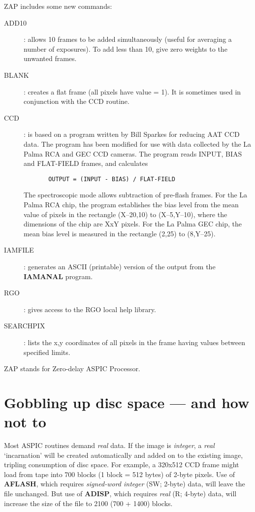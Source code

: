 ZAP includes some new commands:
\begin{description}
\item [ADD10] :
allows 10 frames to be added simultaneously (useful for averaging a number of
exposures).
To add less than 10, give zero weights to the unwanted frames.
\item [BLANK] :
creates a flat frame (all pixels have value = 1).
It is sometimes used in conjunction with the CCD routine.
\item [CCD] :
is based on a program written by Bill Sparkes for reducing AAT CCD data.
The program has been modified for use with data collected by the La Palma RCA
and GEC CCD cameras.
The program reads INPUT, BIAS and FLAT-FIELD frames, and calculates
\begin{verbatim}
       OUTPUT = (INPUT - BIAS) / FLAT-FIELD
\end{verbatim}
The spectroscopic mode allows subtraction of pre-flash frames.
For the La Palma RCA chip, the program establishes the bias level from the
mean value of pixels in the rectangle (X--20,10) to (X--5,Y--10), where the
dimensions of the chip are XxY pixels.
For the La Palma GEC chip, the mean bias level is measured in the rectangle
(2,25) to (8,Y--25).
\item [IAMFILE] :
generates an ASCII (printable) version of the output from the {\bf IAMANAL}
program.
\item [RGO] :
gives access to the RGO local help library.
\item [SEARCHPIX] :
lists the x,y coordinates of all pixels in the frame having values between
specified limits.
\end{description}

ZAP stands for Zero-delay ASPIC Processor.

\section {Gobbling up disc space --- and how not to}

Most ASPIC routines demand {\em real} data.
If the image is {\em integer}, a {\em real} `incarnation' will be created
automatically and added on to the existing image, tripling consumption of
disc space.
For example, a 320x512 CCD frame might load from tape into 700 blocks
(1 block = 512 bytes) of 2-byte pixels.
Use of {\bf AFLASH}, which requires {\em signed-word integer} (SW; 2-byte) data,
will leave the file unchanged.
But use of {\bf ADISP}, which requires {\em real} (R; 4-byte) data, will
increase the size of the file to 2100 (700 + 1400) blocks.

